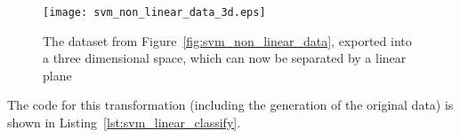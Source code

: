 \begin{figure}[t!]
    \centering
    \texttt{[image: svm\_non\_linear\_data\_3d.eps]}
    \caption{The dataset from Figure~\ref{fig:svm_non_linear_data}, exported into a three dimensional space, which can now be separated by a linear plane}
    \label{fig:svm_non_linear_data_3d}
\end{figure}

The code for this transformation (including the generation of the original data) is shown in Listing~\ref{lst:svm_linear_classify}.\\


